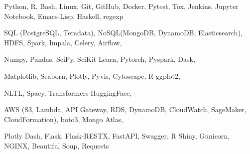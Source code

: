 


\begin{cvskills}


{
Python, R, Bash, Linux, Git, GitHub, Docker, Pytest, Tox, Jenkins, Jupyter Notebook, Emacs-Lisp, Haskell, regexp
}

{
SQL (PostgreSQL, Teradata), NoSQL(MongoDB, DynamoDB, Elasticsearch), HDFS, Spark, Impala, Celery, Airflow,
}

{
Numpy, Pandas, SciPy, SciKit Learn, Pytorch, Pyspark, Dask,
}

{
Matplotlib, Seaborn, Plotly, Pyvis, Cytoscape, R ggplot2,
}

{
NLTL, Spacy, Transformers-HuggingFace,
}

{
AWS (S3, Lambda, API Gateway, RDS, DynamoDB, CloudWatch, SageMaker, CloudFormation), boto3, Mongo Atlas,
}

{
Plotly Dash, Flask, Flask-RESTX, FastAPI, Swagger, R Shiny, Gunicorn, NGINX, Beautiful Soup, Requests
}













\end{cvskills}
